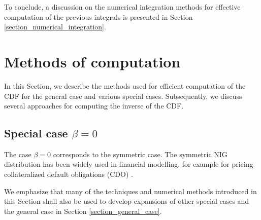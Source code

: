 \documentclass[10pt,a4paper,oneside]{article}
\numberwithin{equation}{section}
\begin{document}
To conclude, a discussion on the numerical integration methods for effective computation of the previous integrals is presented in Section \ref{section_numerical_integration}.

%
%

\section{Methods of computation}
In this Section, we describe the methods used for efficient computation of the CDF for the general case and various special cases. Subsequently, we discuss several approaches for computing the inverse of the CDF.
\subsection{Special case $\beta = 0$}\label{section_special_case_beta_0}
The case $\beta = 0$ corresponds to the symmetric case. The symmetric NIG distribution has been widely used in financial modelling, for example for pricing collateralized default obligations (CDO) \cite{Kalemanova2007}.

We emphasize that many of the techniques and numerical methods introduced in this Section shall also be used to develop expansions of other special cases and the general case in Section \ref{section_general_case}.
\end{document}
